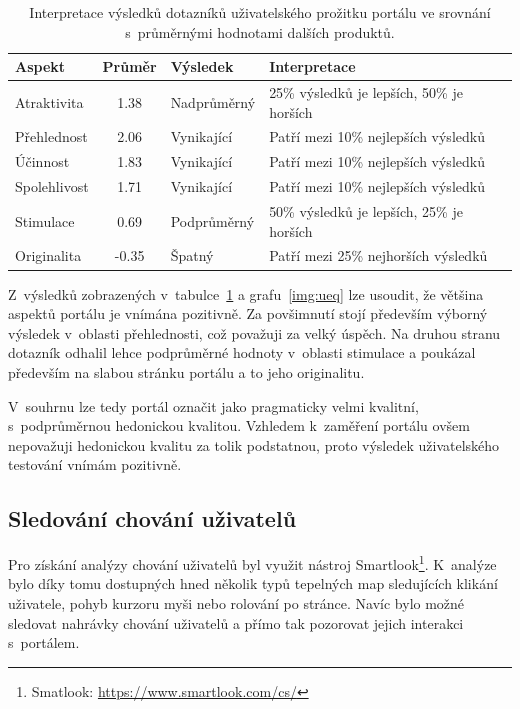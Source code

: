 \begin{table}[H]
\centering
\begin{tabular}{ |l|c|l|l| } 
\hline
Aspekt       & Průměr & Výsledek    & Interpretace                              \\
\hline
Atraktivita  & 1.38   & Nadprůměrný & 25\% výsledků je lepších, 50\% je horších \\
Přehlednost  & 2.06   & Vynikající  & Patří mezi 10\% nejlepších výsledků       \\
Účinnost     & 1.83   & Vynikající  & Patří mezi 10\% nejlepších výsledků       \\
Spolehlivost & 1.71   & Vynikající  & Patří mezi 10\% nejlepších výsledků       \\
Stimulace    & 0.69   & Podprůměrný & 50\% výsledků je lepších, 25\% je horších \\
Originalita  & -0.35  & Špatný      & Patří mezi 25\% nejhorších výsledků       \\  
\hline
\end{tabular}
\caption{Interpretace výsledků dotazníků uživatelského prožitku portálu ve srovnání s~průměrnými hodnotami dalších produktů.}
\label{table:ueq}
\end{table}



Z~výsledků zobrazených v~tabulce~\ref{table:ueq} a grafu~\ref{img:ueq} lze usoudit, že většina aspektů portálu je vnímána pozitivně. Za povšimnutí stojí především výborný výsledek v~oblasti přehlednosti, což považuji za velký úspěch. Na druhou stranu dotazník odhalil lehce podprůměrné hodnoty v~oblasti stimulace a poukázal především na slabou stránku portálu a to jeho originalitu.

V~souhrnu lze tedy portál označit jako pragmaticky velmi kvalitní, s~podprůměrnou hedonickou kvalitou.
Vzhledem k~zaměření portálu ovšem nepovažuji hedonickou kvalitu za tolik podstatnou, proto výsledek uživatelského testování vnímám pozitivně.




\subsection{Sledování chování uživatelů}\label{section:behaviour}
Pro získání analýzy chování uživatelů byl využit nástroj Smartlook\footnote{Smatlook: \url{https://www.smartlook.com/cs/}}. K~analýze bylo díky tomu dostupných hned několik typů tepelných map sledujících klikání uživatele, pohyb kurzoru myši nebo rolování po stránce. Navíc bylo možné sledovat nahrávky chování uživatelů a přímo tak pozorovat jejich interakci s~portálem.

